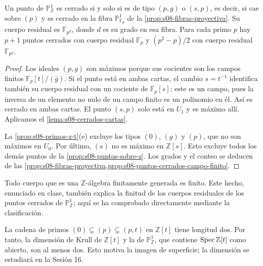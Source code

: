 \begin{prop}
\label{prop:s08-puntos-cerrados-sobre-z}
\label{obs:s08-puntos-cerrados-sobre-z}
Un punto de $\mathbb P_{\mathbb Z}^1$ es cerrado si y solo si es de tipo $(p,g)$ o $(s,p)$, es decir, si cae sobre $(p)$ y es cerrado en la fibra $\mathbb P_{\mathbb F_p}^1$ de la \cref{prop:s08-fibras-proyectiva}. Su cuerpo residual es $\mathbb F_{p^d}$, donde $d$ es su grado en esa fibra. Para cada primo $p$ hay $p+1$ puntos cerrados con cuerpo residual $\mathbb F_p$ y $(p^2-p)/2$ con cuerpo residual $\mathbb F_{p^2}$.
\end{prop}
\begin{proof}
Los ideales $(p,g)$ son máximos porque sus cocientes son los campos finitos $\mathbb F_p[t]/(\bar g)$. Si el punto está en ambas cartas, el cambio $s=t^{-1}$ identifica también su cuerpo residual con un cociente de $\mathbb F_p[s]$; este es un campo, pues la inversa de un elemento no nulo de un campo finito es un polinomio en él. Así es cerrado en ambas cartas. El punto $(s,p)$ solo está en $U_1$ y es máximo allí. Aplicamos el \cref{lema:s08-cerrados-cartas}.

La \cref{prop:s08-primos-z-t}(e) excluye los tipos $(0)$, $(g)$ y $(p)$, que no son máximos en $U_0$. Por último, $(s)$ no es máximo en $\mathbb Z[s]$. Esto excluye todos los demás puntos de la \cref{prop:s08-puntos-sobre-z}. Los grados y el conteo se deducen de las \cref{prop:s08-fibras-proyectiva,prop:s08-puntos-cerrados-campo-finito}.
\end{proof}

\begin{obs}
\label{obs:s08-cuerpos-z-algebras-finitas}
Todo cuerpo que es una $\mathbb Z$-álgebra finitamente generada es finito. Este hecho, enunciado en clase, también explica la finitud de los cuerpos residuales de los puntos cerrados de $\mathbb P_{\mathbb Z}^1$; aquí se ha comprobado directamente mediante la clasificación.
\end{obs}

\begin{obs}[Dimensión]
\label{obs:s08-dimension-proyectiva-z}
La cadena de primos $(0)\subsetneq(p)\subsetneq(p,t)$ en $\mathbb Z[t]$ tiene longitud dos. Por tanto, la dimensión de Krull de $\mathbb Z[t]$ y la de $\mathbb P_{\mathbb Z}^1$, que contiene $\operatorname{Spec}\mathbb Z[t]$ como abierto, son al menos dos. Esto motiva la imagen de superficie; la dimensión se estudiará en la Sesión 16.
\end{obs}

